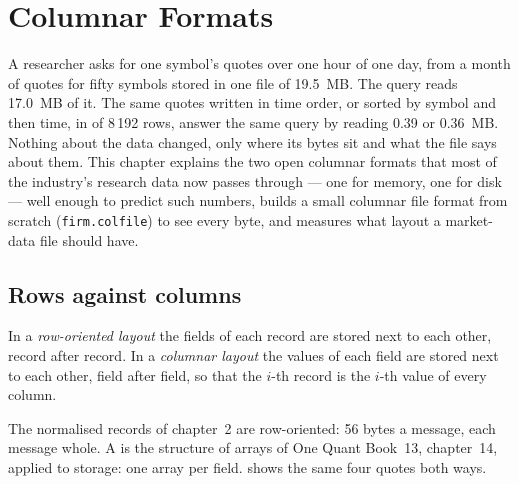 \chapter{Columnar Formats}\label{ch:pl:columnar-formats}

A researcher asks for one symbol's quotes over one hour of one day, from a month of quotes for fifty symbols stored in one
file of 19.5~MB. The query reads 17.0~MB of it. The same quotes written in time order, or sorted by symbol and then time, in
 of 8\,192 rows, answer the same query by reading 0.39 or 0.36~MB. Nothing about the data changed, only where its
bytes sit and what the file says about them. This chapter explains the two open columnar formats that most of the industry's
research data now passes through --- one for memory, one for disk --- well enough to predict such numbers, builds a small
columnar file format from scratch (\texttt{firm.colfile}) to see every byte, and measures what layout a market-data file
should have.

\section{Rows against columns}

\begin{definition}\label{def:pl:columnar-formats:layouts}
In a \emph{row-oriented layout} the fields of each record are stored next to each other, record
after record. In a \emph{columnar layout} the values of each field are stored next to each other, field
after field, so that the $i$-th record is the $i$-th value of every column.
\end{definition}

The normalised records of chapter~2 are row-oriented: 56 bytes a message, each message whole. A  is the
structure of arrays of One Quant Book~13, chapter~14, applied to storage: one array per field.
 shows the same four quotes both ways.

